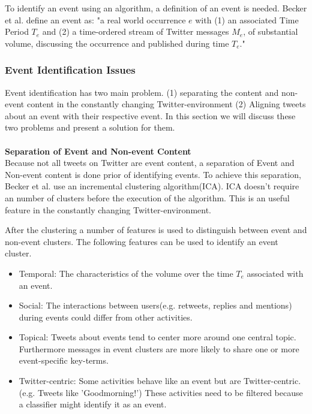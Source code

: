 \documentclass{article}
\begin{document}
To identify an event using an algorithm, a definition of an event is needed. Becker et al.  define an event as: "a real world occurrence $e$ with (1) an associated Time Period $T_e$ and (2) a time-ordered stream of Twitter messages $M_e$, of substantial volume, discussing the occurrence and published during time $T_e$." \cite{eventident} 

\subsubsection*{Event Identification Issues}

Event identification has two main problem. (1) separating the content and non-event content in the constantly changing 
Twitter-environment (2) Aligning tweets about an event with their respective event. In this section we will discuss these two problems and present a solution for them.
\\\\ 
\textbf{Separation of Event and Non-event Content}\\

Because not all tweets on Twitter are event content, a separation of Event and Non-event content is done prior of identifying events. To achieve this separation, Becker et al.  use an incremental clustering algorithm(ICA). ICA doesn't require an number of clusters before the execution of the algorithm. This is an useful feature in the constantly changing Twitter-environment. \cite{eventident} 

After the clustering a number of features is used to distinguish between event and non-event clusters. The following features can be used to identify an event cluster. \cite{eventident} 
\begin{itemize}
  \item Temporal: The characteristics of the volume over the time $T_e$ associated with an event. 
  \item Social: The interactions between users(e.g. retweets, replies and mentions) during events could differ from other activities. 
  \item Topical: Tweets about events tend to center more around one central topic. Furthermore messages in event clusters are more likely to share one or more event-specific key-terms.  
  \item Twitter-centric: Some activities behave like an event but are Twitter-centric.(e.g. Tweets like 'Goodmorning!') These activities need to be filtered because a classifier might identify it as an event. 
\end{itemize}
\end{document}
